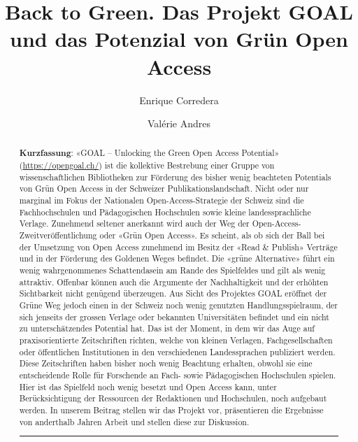 \documentclass[a4paper,
fontsize=11pt,
oneside,
numbers=noperiodatend,
parskip=half-,
bibliography=totoc,
final
]{scrartcl}
\title{\LARGE{Back to Green. Das Projekt GOAL und das Potenzial von Grün Open Access}}%
\author{Enrique Corredera \and Valérie Andres} %
\date{}
\begin{document}
\maketitle
\thispagestyle{fancyplain} 

\begin{abstract}
\noindent
\textbf{Kurzfassung}: «GOAL -- Unlocking the Green Open Access
Potential» (\url{https://opengoal.ch/}) ist die kollektive Bestrebung
einer Gruppe von wissenschaftlichen Bibliotheken zur Förderung des
bisher wenig beachteten Potentials von Grün Open Access in der Schweizer
Publikationslandschaft. Nicht oder nur marginal im Fokus der Nationalen
Open-Access-Strategie der Schweiz sind die Fachhochschulen und
Pädagogischen Hochschulen sowie kleine landessprachliche Verlage.
Zunehmend seltener anerkannt wird auch der Weg der
Open-Access-Zweitveröffentlichung oder «Grün Open Access». Es scheint,
als ob sich der Ball bei der Umsetzung von Open Access zunehmend im
Besitz der «Read \& Publish» Verträge und in der Förderung des Goldenen
Weges befindet. Die «grüne Alternative» führt ein wenig wahrgenommenes
Schattendasein am Rande des Spielfeldes und gilt als wenig attraktiv.
Offenbar können auch die Argumente der Nachhaltigkeit und der erhöhten
Sichtbarkeit nicht genügend überzeugen. Aus Sicht des Projektes GOAL
eröffnet der Grüne Weg jedoch einen in der Schweiz noch wenig genutzten
Handlungsspielraum, der sich jenseits der grossen Verlage oder bekannten
Universitäten befindet und ein nicht zu unterschätzendes Potential hat.
Das ist der Moment, in dem wir das Auge auf praxisorientierte
Zeitschriften richten, welche von kleinen Verlagen, Fachgesellschaften
oder öffentlichen Institutionen in den verschiedenen Landessprachen
publiziert werden. Diese Zeitschriften haben bisher noch wenig Beachtung
erhalten, obwohl sie eine entscheidende Rolle für Forschende an Fach-
sowie Pädagogischen Hochschulen spielen. Hier ist das Spielfeld noch
wenig besetzt und Open Access kann, unter Berücksichtigung der
Ressourcen der Redaktionen und Hochschulen, noch aufgebaut werden. In
unserem Beitrag stellen wir das Projekt vor, präsentieren die Ergebnisse
von anderthalb Jahren Arbeit und stellen diese zur Diskussion.

\begin{center}\rule{0.5\linewidth}{0.5pt}\end{center}


\end{abstract}
\end{document}
